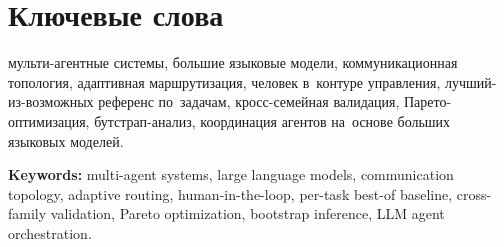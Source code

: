 
\section*{Ключевые слова}

\noindent мульти-агентные системы, большие языковые модели,
коммуникационная топология, адаптивная маршрутизация, человек
в~контуре управления, лучший-из-возможных референс по~задачам,
кросс-семейная валидация, Парето-оптимизация, бутстрап-анализ,
координация агентов на~основе больших языковых моделей.

\vspace{0.5cm}

\noindent\textbf{Keywords:} multi-agent systems, large language
models, communication topology, adaptive routing, human-in-the-loop,
per-task best-of baseline, cross-family validation, Pareto optimization,
bootstrap inference, LLM agent orchestration.
